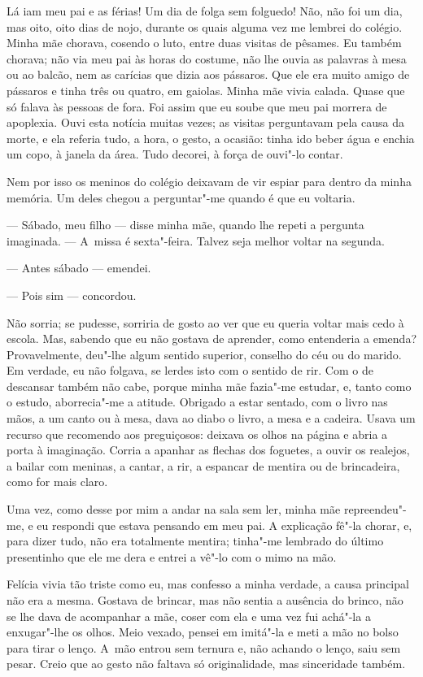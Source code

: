\begin{linenumbers}
Lá iam meu pai e as férias! Um dia de folga sem folguedo! Não, não foi
um dia, mas oito, oito dias de nojo, durante os quais alguma vez me
lembrei do colégio. Minha mãe chorava, cosendo o luto, entre duas
visitas de pêsames. Eu também chorava; não via meu pai às horas do
costume, não lhe ouvia as palavras à mesa ou ao balcão, nem as carícias
que dizia aos pássaros. Que ele era muito amigo de pássaros e tinha três
ou quatro, em gaiolas. Minha mãe vivia calada. Quase que só falava às
pessoas de fora. Foi assim que eu soube que meu pai morrera de
apoplexia. Ouvi esta notícia muitas vezes; as visitas perguntavam pela
causa da morte, e ela referia tudo, a hora, o gesto, a ocasião: tinha
ido beber água e enchia um copo, à janela da área. Tudo decorei, à força
de ouvi"-lo contar.

Nem por isso os meninos do colégio deixavam de vir espiar para dentro da
minha memória. Um deles chegou a perguntar"-me quando é que eu voltaria.

--- Sábado, meu filho --- disse minha mãe, quando lhe repeti a pergunta
imaginada. --- A~missa é sexta"-feira. Talvez seja melhor voltar na
segunda.

--- Antes sábado --- emendei.

--- Pois sim --- concordou.

Não sorria; se pudesse, sorriria de gosto ao ver que eu queria voltar
mais cedo à escola. Mas, sabendo que eu não gostava de aprender, como
entenderia a emenda? Provavelmente, deu"-lhe algum sentido superior,
conselho do céu ou do marido. Em verdade, eu não folgava, se lerdes isto
com o sentido de rir. Com o de descansar também não cabe, porque minha
mãe fazia"-me estudar, e, tanto como o estudo, aborrecia"-me a atitude.
Obrigado a estar sentado, com o livro nas mãos, a um canto ou à mesa,
dava ao diabo o livro, a mesa e a cadeira. Usava um recurso que
recomendo aos preguiçosos: deixava os olhos na página e abria a porta à
imaginação. Corria a apanhar as flechas dos foguetes, a ouvir os
realejos, a bailar com meninas, a cantar, a rir, a espancar de mentira
ou de brincadeira, como for mais claro.

Uma vez, como desse por mim a andar na sala sem ler, minha mãe
repreendeu"-me, e eu respondi que estava pensando em meu pai. A
explicação fê"-la chorar, e, para dizer tudo, não era totalmente mentira;
tinha"-me lembrado do último presentinho que ele me dera e entrei a vê"-lo
com o mimo na mão.

Felícia vivia tão triste como eu, mas confesso a minha verdade, a causa
principal não era a mesma. Gostava de brincar, mas não sentia a ausência
do brinco, não se lhe dava de acompanhar a mãe, coser com ela e uma vez
fui achá"-la a enxugar"-lhe os olhos. Meio vexado, pensei em imitá"-la e
meti a mão no bolso para tirar o lenço. A~mão entrou sem ternura e, não
achando o lenço, saiu sem pesar. Creio que ao gesto não faltava só
originalidade, mas sinceridade também.


\end{linenumbers}
